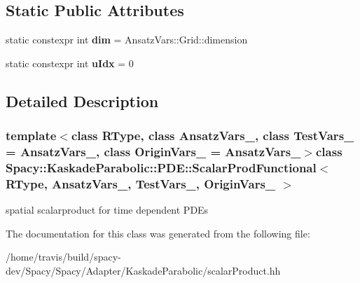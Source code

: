 \subsection*{Static Public Attributes}
\begin{DoxyCompactItemize}
\item 
\hypertarget{classSpacy_1_1KaskadeParabolic_1_1PDE_1_1ScalarProdFunctional_a0080324fbf6e0e57179c35b3a0e95130}{static constexpr int {\bfseries dim} = Ansatz\-Vars\-::\-Grid\-::dimension}\label{classSpacy_1_1KaskadeParabolic_1_1PDE_1_1ScalarProdFunctional_a0080324fbf6e0e57179c35b3a0e95130}

\item 
\hypertarget{classSpacy_1_1KaskadeParabolic_1_1PDE_1_1ScalarProdFunctional_a437121b24f7cb70e093f1395dc980601}{static constexpr int {\bfseries u\-Idx} = 0}\label{classSpacy_1_1KaskadeParabolic_1_1PDE_1_1ScalarProdFunctional_a437121b24f7cb70e093f1395dc980601}

\end{DoxyCompactItemize}


\subsection{Detailed Description}
\subsubsection*{template$<$class R\-Type, class Ansatz\-Vars\-\_\-, class Test\-Vars\-\_\- = Ansatz\-Vars\-\_\-, class Origin\-Vars\-\_\- = Ansatz\-Vars\-\_\-$>$class Spacy\-::\-Kaskade\-Parabolic\-::\-P\-D\-E\-::\-Scalar\-Prod\-Functional$<$ R\-Type, Ansatz\-Vars\-\_\-, Test\-Vars\-\_\-, Origin\-Vars\-\_\- $>$}

spatial scalarproduct for time dependent P\-D\-Es 

The documentation for this class was generated from the following file\-:\begin{DoxyCompactItemize}
\item 
/home/travis/build/spacy-\/dev/\-Spacy/\-Spacy/\-Adapter/\-Kaskade\-Parabolic/scalar\-Product.\-hh\end{DoxyCompactItemize}
